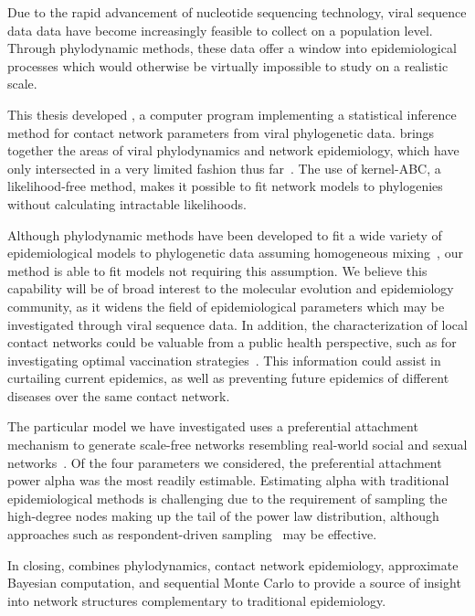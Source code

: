 Due to the rapid advancement of nucleotide sequencing technology, viral
sequence data data have become increasingly feasible to collect on a population
level. Through phylodynamic methods, these data offer a window into
epidemiological processes which would otherwise be virtually impossible to
study on a realistic scale. 

This thesis developed , a computer program implementing a
statistical inference method for contact network parameters from viral
phylogenetic data.  brings together the areas of viral
phylodynamics and network epidemiology, which have only intersected in a very
limited fashion thus far~\autocite{welch2011statistical}. The use of
kernel-\gls{ABC}, a likelihood-free method, makes it possible to fit network
models to phylogenies without calculating intractable likelihoods.

Although phylodynamic methods have been developed to fit a wide variety of
epidemiological models to phylogenetic data assuming homogeneous
mixing~\autocite{volz2012complex, rasmussen2014phylodynamic}, our method is
able to fit models not requiring this assumption. We believe this capability
will be of broad interest to the molecular evolution and epidemiology
community, as it widens the field of epidemiological parameters which may be
investigated through viral sequence data. In addition, the characterization of
local contact networks could be valuable from a public health perspective, such
as for investigating optimal vaccination
strategies~\autocite{keeling2005networks, peng2013vaccination,
ma2013importance, rushmore2014network}. This information could assist in
curtailing current epidemics, as well as preventing future epidemics of
different diseases over the same contact network.

The particular model we have investigated uses a preferential attachment
mechanism to generate scale-free networks resembling real-world social and
sexual networks~\autocite{liljeros2001web, schneeberger2004scale,
colgate1989risk}. Of the four parameters we considered, the preferential
attachment power \gls{alpha} was the most readily estimable. Estimating
\gls{alpha} with traditional epidemiological methods is challenging due to the
requirement of sampling the high-degree nodes making up the tail of the power
law distribution, although approaches such as respondent-driven
sampling~\autocite{heckathorn1997respondent}  may be effective.

In closing,  combines phylodynamics, contact network
epidemiology, approximate Bayesian computation, and sequential Monte Carlo 
to provide a source of insight into network structures complementary to
traditional epidemiology.
